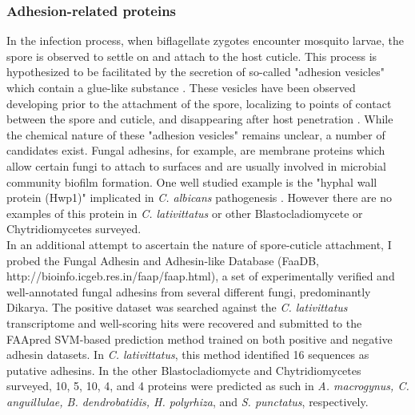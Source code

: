 \subsubsection*{Adhesion-related proteins}
In the infection process, when biflagellate zygotes encounter mosquito larvae, the spore is observed to settle on and attach to the host cuticle. This process is hypothesized to be facilitated by the secretion of so-called "adhesion vesicles" which contain a glue-like substance \cite{Travland1979}. These vesicles have been observed developing prior to the attachment of the spore, localizing to points of contact between the spore and cuticle, and disappearing after host penetration \cite{Travland1979}. While the chemical nature of these "adhesion vesicles" remains unclear, a number of candidates exist. Fungal adhesins, for example, are membrane proteins which allow certain fungi to attach to surfaces and are usually involved in microbial community biofilm formation. One well studied example is the "hyphal wall protein (Hwp1)" implicated in \textit{C. albicans} pathogenesis \cite{Staab1999}. However there are no examples of this protein in \textit{C. lativittatus} or other Blastocladiomycete or Chytridiomycetes surveyed.\\ 
\indent In an additional attempt to ascertain the nature of spore-cuticle attachment, I probed the Fungal Adhesin and Adhesin-like Database (FaaDB, http://bioinfo.icgeb.res.in/faap/faap.html), a set of experimentally verified and well-annotated fungal adhesins from several different fungi, predominantly Dikarya. The positive dataset was searched against the \textit{C. lativittatus} transcriptome and well-scoring hits were recovered and submitted to the FAApred SVM-based prediction method trained on both positive and negative adhesin datasets. In \textit{C. lativittatus}, this method identified 16 sequences as putative adhesins. In the other Blastocladiomycte and Chytridiomycetes surveyed, 10, 5, 10, 4, and 4 proteins were predicted as such in \textit{A. macrogynus, C. anguillulae, B. dendrobatidis, H. polyrhiza}, and \textit{S. punctatus}, respectively. 
